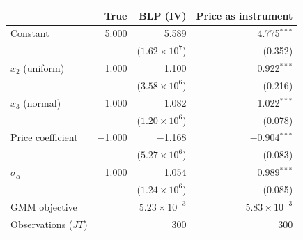 \begin{tabular}{lrrr}
\toprule
 & True & BLP (IV) & Price as instrument \\
\midrule
Constant & 5.000 & 5.589 & 4.775$^{***}$ \\
 &  & ($1.62\times10^{7}$) & (0.352) \\
$x_2$ (uniform) & 1.000 & 1.100 & 0.922$^{***}$ \\
 &  & ($3.58\times10^{6}$) & (0.216) \\
$x_3$ (normal) & 1.000 & 1.082 & 1.022$^{***}$ \\
 &  & ($1.20\times10^{6}$) & (0.078) \\
Price coefficient & $-$1.000 & $-$1.168 & $-$0.904$^{***}$ \\
 &  & ($5.27\times10^{6}$) & (0.083) \\
$\sigma_\alpha$ & 1.000 & 1.054 & 0.989$^{***}$ \\
 &  & ($1.24\times10^{6}$) & (0.085) \\
\midrule
GMM objective &  & $5.23\times10^{-3}$ & $5.83\times10^{-3}$ \\
Observations ($JT$) &  & 300 & 300 \\
\bottomrule
\end{tabular}
